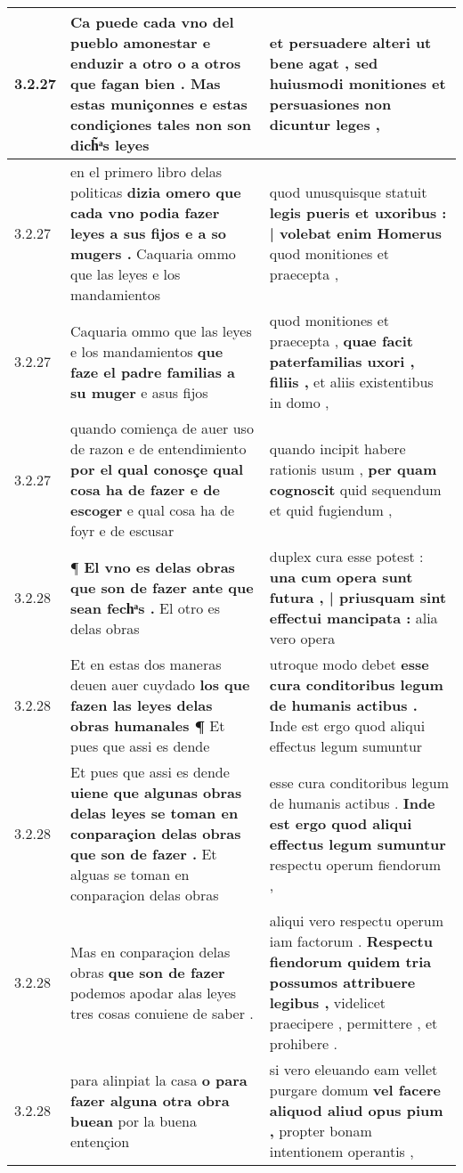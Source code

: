 \begin{tabular}{|p{1cm}|p{6.5cm}|p{6.5cm}|}
3.2.27 & Ca puede cada vno del pueblo amonestar e enduzir a otro o a otros \textbf{ que fagan bien . } Mas estas muniçonnes e estas condiçiones tales non son dich̃ͣs leyes & et persuadere alteri \textbf{ ut bene agat , } sed huiusmodi monitiones et persuasiones non dicuntur leges , \\\hline
3.2.27 & en el primero libro delas politicas \textbf{ dizia omero que cada vno podia fazer leyes a sus fijos e a so mugers . } Caquaria ommo que las leyes e los mandamientos & quod unusquisque statuit \textbf{ legis pueris et uxoribus : | volebat enim Homerus } quod monitiones et praecepta , \\\hline
3.2.27 & Caquaria ommo que las leyes e los mandamientos \textbf{ que faze el padre familias a su muger } e asus fijos & quod monitiones et praecepta , \textbf{ quae facit paterfamilias uxori , filiis , } et aliis existentibus in domo , \\\hline
3.2.27 & quando comiença de auer uso de razon e de entendimiento \textbf{ por el qual conosçe qual cosa ha de fazer e de escoger } e qual cosa ha de foyr e de escusar & quando incipit habere rationis usum , \textbf{ per quam cognoscit } quid sequendum et quid fugiendum , \\\hline
3.2.28 & ¶ \textbf{ El vno es delas obras que son de fazer ante que sean fechͣs . } El otro es delas obras & duplex cura esse potest : \textbf{ una cum opera sunt futura , | priusquam sint effectui mancipata : } alia vero opera \\\hline
3.2.28 & Et en estas dos maneras deuen auer cuydado \textbf{ los que fazen las leyes delas obras humanales ¶ } Et pues que assi es dende & utroque modo debet \textbf{ esse cura conditoribus legum de humanis actibus . } Inde est ergo quod aliqui effectus legum sumuntur \\\hline
3.2.28 & Et pues que assi es dende \textbf{ uiene que algunas obras delas leyes se toman en conparaçion delas obras que son de fazer . } Et alguas se toman en conparaçion delas obras & esse cura conditoribus legum de humanis actibus . \textbf{ Inde est ergo quod aliqui effectus legum sumuntur } respectu operum fiendorum , \\\hline
3.2.28 & Mas en conparaçion delas obras \textbf{ que son de fazer } podemos apodar alas leyes tres cosas conuiene de saber . & aliqui vero respectu operum iam factorum . \textbf{ Respectu fiendorum quidem tria possumos attribuere legibus , } videlicet praecipere , permittere , et prohibere . \\\hline
3.2.28 & para alinpiat la casa \textbf{ o para fazer alguna otra obra buean } por la buena entençion & si vero eleuando eam vellet purgare domum \textbf{ vel facere aliquod aliud opus pium , } propter bonam intentionem operantis , \\\hline

\end{tabular}
